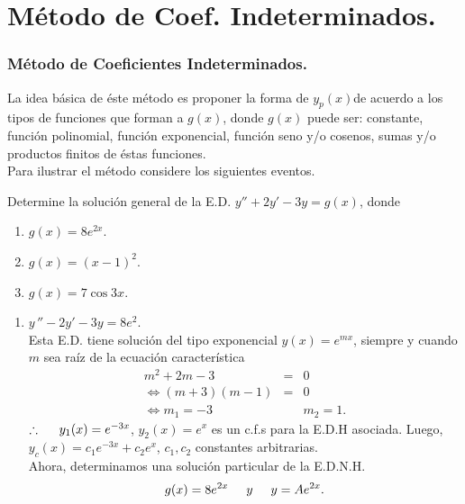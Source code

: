 \documentclass[9pt]{beamer}
\begin{document}
\section{Método de Coef. Indeterminados.} %
\begin{frame}[t]
	\frametitle{Método de Coeficientes Indeterminados.}
	\begin{block}{}
		La idea básica de éste método es proponer la forma de \(y_p(x)\)de acuerdo a los tipos de funciones que forman a \(g(x)\), donde \(g(x)\) puede ser: constante, función polinomial, función exponencial, función seno y/o cosenos, sumas y/o productos finitos de éstas funciones. \\[2mm]
		Para ilustrar el método considere los siguientes eventos.
	\end{block}
	\begin{example}
		Determine la solución general de la E.D. \(y'' + 2y' -3y=g(x)\), donde
		\begin{enumerate}
			\item \(g(x) = 8e^{2x}\).
			\item \(g(x) = (x-1) ^2\).
			\item \(g(x) = 7 \cos 3x\).
		\end{enumerate}
	\end{example}
\end{frame}

\begin{frame}[t]
	\begin{exampleblock}{}
		\begin{enumerate}
			\item \(y\,'' -2y' -3y = 8e^2\). \\[2mm]
				Esta E.D. tiene solución del tipo exponencial \(y(x) = e^{mx}\), siempre y cuando \(m\) sea raíz de la ecuación característica
				\[
					\begin{array}{rcl}
						m^2+2m-3 & = & 0 \\[2mm]
						\iff (m+3) (m-1) & = & 0 \\[2mm]
						\iff m_1=-3 && m_2=1.
					\end{array}
				\]
				\(\therefore \hspace{5mm} y_1(x) = e^{-3x}\), \(y_2(x) = e^x\) es un c.f.s para la E.D.H asociada. Luego, \(y_c(x) = c_1e^{-3x} + c_2e^{x}\), \(c_1,c_2\) constantes arbitrarias. \\[2mm]
				Ahora, determinamos una solución particular de la E.D.N.H.
				\[
					g(x) = 8e^{2x} \hspace{5mm} y \hspace{5mm} y = Ae^{2x}.
				\]
		\end{enumerate}
	\end{exampleblock}
\end{frame}
\end{document}
